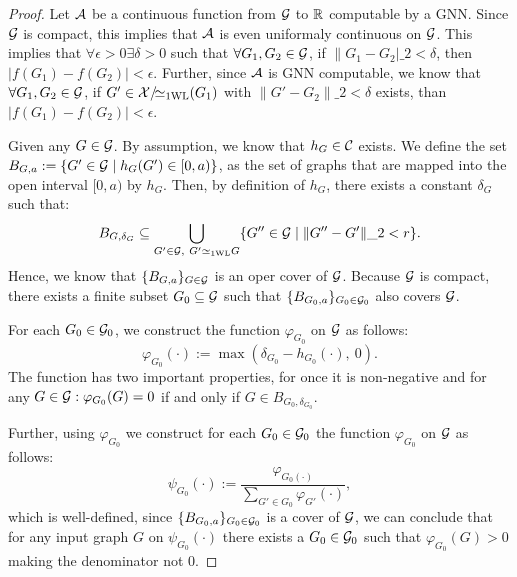 \begin{proof}
    Let $\mathcal{A}$ be a continuous function from $\mathcal{G}$ to $\mathbb{R}$ computable by a GNN. Since $\mathcal{G}$ is compact, this implies that $\mathcal{A}$ is even uniformaly continuous on $\mathcal{G}$. This implies that $\forall \epsilon > 0 \exists \delta > 0$ such that $\forall G_1, G_2 \in \mathcal{G}$, if $\| G_1 - G_2 |\_2 < \delta$, then $|f(G_1) - f(G_2)| < \epsilon$. Further, since $\mathcal{A}$ is GNN computable, we know that $\forall G_1, G_2 \in \mathcal{G}$, if $G' \in \mathcal{X}/\!{\simeq_{\text{1WL}}}(G_1)$ with $\| G' - G_2 \|\_2 < \delta$ exists, than $|f(G_1) - f(G_2)| < \epsilon$.

    Given any $G \in \mathcal{G}$. By assumption, we know that $h_{G} \in \mathcal{C}$ exists. We define the set $B_{G, a} := \{ G' \in \mathcal{G} \mid h_G(G') \in [0, a) \}$, as the set of graphs that are mapped into the open interval $[0, a)$ by $h_G$. Then, by definition of $h_G$, there exists a constant $\delta_G$ such that:
    \begin{equation*}
        B_{G, \delta_G} \subseteq \bigcup_{G' \in \mathcal{G}, \ G' \simeq_{\text{1WL}} G} \{ G'' \in \mathcal{G} \mid \| G'' - G' \|\_2 < r \}.
    \end{equation*}
    Hence, we know that $\{ B_{G, a} \}_{G \in \mathcal{G}}$ is an oper cover of $\mathcal{G}$.
    Because $\mathcal{G}$ is compact, there exists a finite subset $G_0 \subseteq \mathcal{G}$ such that $\{ B_{G_0, a} \}_{G_0 \in \mathcal{G}_0}$ also covers $\mathcal{G}$.

    For each $G_0 \in \mathcal{G}_0$, we construct the function $\varphi_{G_0}$ on $\mathcal{G}$ as follows:
    \begin{equation*}
        \varphi_{G_0} (\cdot) := \max(\delta_{G_0} -  h_{G_0}(\cdot), \ 0).
    \end{equation*}
    The function has two important properties, for once it is non-negative and for any $G \in \mathcal{G}: \varphi_{G_0}(G) = 0$ if and only if $G \in B_{G_0, \delta_{G_0}}$.

    Further, using $\varphi_{G_0}$ we construct for each $G_0 \in \mathcal{G}_0$ the function $\varphi_{G_0}$ on $\mathcal{G}$ as follows:
    \begin{equation*}
        \psi_{G_0}(\cdot) := \frac{\varphi_{G_0(\cdot)}}{\sum_{G' \in G_0} \varphi_{G'}(\cdot)},
    \end{equation*}
    which is well-defined, since $\{ B_{G_0, a} \}_{G_0 \in \mathcal{G}_0}$ is a cover of $\mathcal{G}$, we can conclude that for any input graph $G$ on $\psi_{G_0}(\cdot)$ there exists a $G_0 \in \mathcal{G}_0$ such that $\varphi_{G_0}(G) > 0$ making the denominator not $0$.

\end{proof}

\newpage